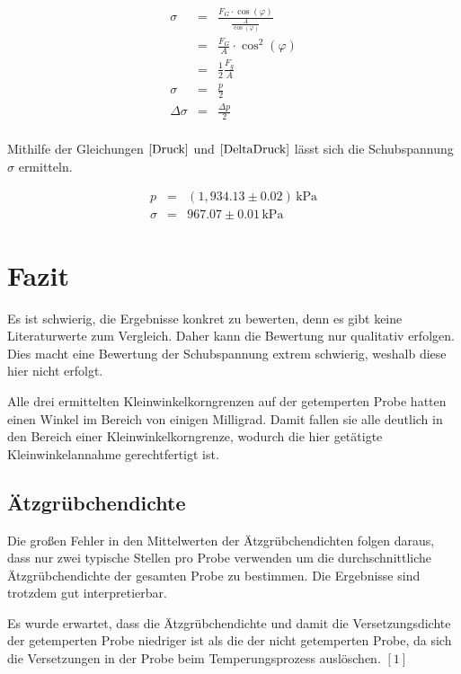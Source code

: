 \documentclass[12pt,a4paper]{scrartcl}
\numberwithin{equation}{section} %
\renewcommand{\[}{} %
\renewcommand{\]}{\noindent} %
\begin{document}
\[
\begin{eqnarray}
    \sigma &=& \frac{F_G \cdot \cos(\varphi)}{\frac{A}{\cos(\varphi)}}\\
        &=&\frac{F_G}{A} \cdot \cos^2(\varphi) \\
        &=& \frac{1}{2}\frac{F_g}{A}\\
    \sigma &=& \frac{p}{2} \\
    \Delta \sigma &=& \frac{\Delta p}{2}\\
\end{eqnarray}
\]

Mithilfe der Gleichungen \(\eqref{Druck}\) und \(\eqref{DeltaDruck}\)
lässt sich die Schubspannung \(\sigma\) ermitteln.

\[
\begin{eqnarray}
    p &=& (1,934.13 \pm 0.02) \mathrm{\,kPa} \\
    \sigma &=& 967.07 \pm 0.01 \mathrm{\,kPa}
\end{eqnarray}
\]

\hypertarget{fazit}{%
\section{Fazit}\label{fazit}}

Es ist schwierig, die Ergebnisse konkret zu bewerten, denn es gibt keine
Literaturwerte zum Vergleich. Daher kann die Bewertung nur qualitativ
erfolgen. Dies macht eine Bewertung der Schubspannung extrem schwierig,
weshalb diese hier nicht erfolgt.

Alle drei ermittelten Kleinwinkelkorngrenzen auf der getemperten Probe
hatten einen Winkel im Bereich von einigen Milligrad. Damit fallen sie
alle deutlich in den Bereich einer Kleinwinkelkorngrenze, wodurch die
hier getätigte Kleinwinkelannahme gerechtfertigt ist.

\hypertarget{uxe4tzgruxfcbchendichte-1}{%
\subsection{Ätzgrübchendichte}\label{uxe4tzgruxfcbchendichte-1}}

Die großen Fehler in den Mittelwerten der Ätzgrübchendichten folgen
daraus, dass nur zwei typische Stellen pro Probe verwenden um die
durchschnittliche Ätzgrübchendichte der gesamten Probe zu bestimmen. Die
Ergebnisse sind trotzdem gut interpretierbar.

Es wurde erwartet, dass die Ätzgrübchendichte und damit die
Versetzungsdichte der getemperten Probe niedriger ist als die der nicht
getemperten Probe, da sich die Versetzungen in der Probe beim
Temperungsprozess auslöschen. \([1]\)
\end{document}
